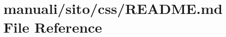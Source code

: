 \hypertarget{manuali_2sito_2css_2README_8md}{}\section{manuali/sito/css/\+R\+E\+A\+D\+ME.md File Reference}
\label{manuali_2sito_2css_2README_8md}
